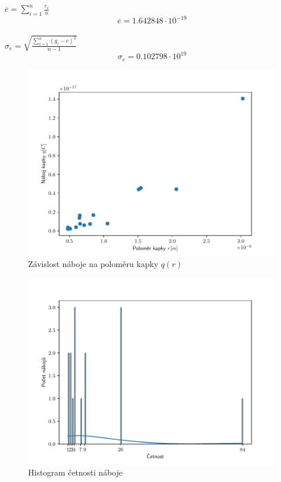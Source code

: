 \documentclass{article}
\begin{document}
\\
\vspace{1em}
\\
$\overline{e} = \sum^{n}_{i=1}\frac{e_{i}}{n}$\\
$$\overline{e} = 1.642848 \cdot 10 ^{-19}$$ \\
$\sigma_{e} = \sqrt{\frac{\sum^{n}_{i=1}(g_{i} - \overline{e})^{2}}{n-1}}$\\
$$\sigma_{e} = 0.102798 \cdot 10 ^{19}$$
\begin{figure}[!h]
  \includegraphics[scale=1]{data/graph1.pdf}
  \caption{Závislost náboje na poloměru kapky $q(r)$}
\end{figure}
\newpage
\begin{figure}[!h]
  \includegraphics[scale=1]{data/hist.pdf}
  \caption{Histogram četnosti náboje}
\end{figure}
\end{document}
